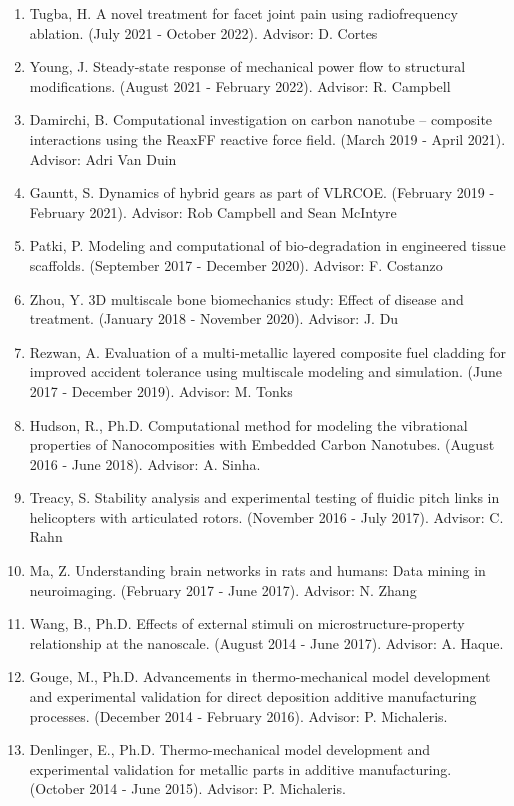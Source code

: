 \documentclass[
]{article}
\begin{document}
\begin{enumerate}
  \def\labelenumi{\arabic{enumi}.}
    \item Tugba, H. A novel treatment for facet joint pain using radiofrequency ablation. (July 2021 - October 2022). Advisor: D. Cortes
    \item Young, J. Steady-state response of mechanical power flow to structural modifications. (August 2021 - February 2022). Advisor: R. Campbell
    \item Damirchi, B. Computational investigation on carbon nanotube – composite interactions using the ReaxFF reactive force field. (March 2019 - April 2021). Advisor: Adri Van Duin
    \item Gauntt, S. Dynamics of hybrid gears as part of VLRCOE. (February 2019 - February 2021). Advisor: Rob Campbell and Sean McIntyre
    \item Patki, P. Modeling and computational of bio-degradation in engineered tissue scaffolds. (September 2017 - December 2020). Advisor: F. Costanzo
    \item Zhou, Y. 3D multiscale bone biomechanics study: Effect of disease and treatment. (January 2018 - November 2020). Advisor: J. Du
    \item Rezwan, A. Evaluation of a multi-metallic layered composite fuel cladding for improved accident tolerance using multiscale modeling and simulation. (June 2017 - December 2019). Advisor: M. Tonks
    \item Hudson, R., Ph.D. Computational method for modeling the vibrational properties of Nanocomposities with Embedded Carbon Nanotubes. (August 2016 - June 2018). Advisor: A. Sinha.
    \item Treacy, S. Stability analysis and experimental testing of fluidic pitch links in helicopters with articulated rotors. (November 2016 - July 2017). Advisor: C. Rahn
    \item Ma, Z. Understanding brain networks in rats and humans: Data mining in neuroimaging. (February 2017 - June 2017). Advisor: N. Zhang
    \item Wang, B., Ph.D. Effects of external stimuli on microstructure-property relationship at the nanoscale. (August 2014 - June 2017). Advisor: A. Haque.
    \item Gouge, M., Ph.D. Advancements in thermo-mechanical model development and experimental validation for direct deposition additive manufacturing processes. (December 2014 - February 2016). Advisor: P. Michaleris.
    \item Denlinger, E., Ph.D. Thermo-mechanical model development and experimental validation for metallic parts in additive manufacturing. (October 2014 - June 2015). Advisor: P. Michaleris.
\end{enumerate}
\end{document}
